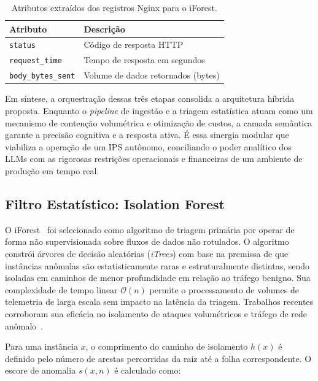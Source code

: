\documentclass[sigconf, anonymous]{acmart}
\begin{document}
\begin{table}[htbp]
\caption{Atributos extraídos dos registros Nginx para o \ac{iForest}.}
\label{tab:features}
\centering
\begin{tabular}{ll}
\toprule
\textbf{Atributo} & \textbf{Descrição} \\
\midrule
\texttt{status} & Código de resposta HTTP \\
\texttt{request\_time} & Tempo de resposta em segundos \\
\texttt{body\_bytes\_sent} & Volume de dados retornados (bytes) \\
\bottomrule
\end{tabular}
\end{table}

Em síntese, a orquestração dessas três etapas consolida a arquitetura híbrida proposta. Enquanto o \textit{pipeline} de ingestão e a triagem estatística atuam como um mecanismo de contenção volumétrica e otimização de custos, a camada semântica garante a precisão cognitiva e a resposta ativa. É essa sinergia modular que viabiliza a operação de um \ac{IPS} autônomo, conciliando o poder analítico dos \acp{LLM} com as rigorosas restrições operacionais e financeiras de um ambiente de produção em tempo real.

\subsection{Filtro Estatístico: Isolation Forest}
\label{sec:iforest}

O \ac{iForest}~\cite{liu2008isolation} foi selecionado como algoritmo de triagem primária por operar de forma não supervisionada sobre fluxos de dados não rotulados. O algoritmo constrói árvores de decisão aleatórias (\textit{iTrees}) com base na premissa de que instâncias anômalas são estatisticamente raras e estruturalmente distintas, sendo isoladas em caminhos de menor profundidade em relação ao tráfego benigno. Sua complexidade de tempo linear $\mathcal{O}(n)$ permite o processamento de volumes de telemetria de larga escala sem impacto na latência da triagem. Trabalhos recentes corroboram sua eficácia no isolamento de ataques volumétricos e tráfego de rede anômalo~\cite{alhumaima2026comprehensive, maspo2026anomaly}.

Para uma instância $x$, o comprimento do caminho de isolamento $h(x)$ é definido pelo número de arestas percorridas da raiz até a folha correspondente. O escore de anomalia $s(x, n)$ é calculado como:
\end{document}
